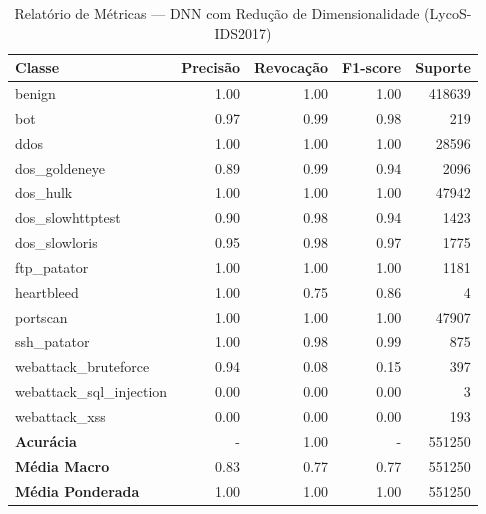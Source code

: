 \begin{table}[H]
    \centering
    \small
    \begin{tabular}{lrrrr}
        \hline
        Classe                    & Precisão & Revocação & F1-score & Suporte \\
        \hline
        benign                    & 1.00     & 1.00      & 1.00     & 418639  \\
        bot                       & 0.97     & 0.99      & 0.98     & 219     \\
        ddos                      & 1.00     & 1.00      & 1.00     & 28596   \\
        dos\_goldeneye            & 0.89     & 0.99      & 0.94     & 2096    \\
        dos\_hulk                 & 1.00     & 1.00      & 1.00     & 47942   \\
        dos\_slowhttptest         & 0.90     & 0.98      & 0.94     & 1423    \\
        dos\_slowloris            & 0.95     & 0.98      & 0.97     & 1775    \\
        ftp\_patator              & 1.00     & 1.00      & 1.00     & 1181    \\
        heartbleed                & 1.00     & 0.75      & 0.86     & 4       \\
        portscan                  & 1.00     & 1.00      & 1.00     & 47907   \\
        ssh\_patator              & 1.00     & 0.98      & 0.99     & 875     \\
        webattack\_bruteforce     & 0.94     & 0.08      & 0.15     & 397     \\
        webattack\_sql\_injection & 0.00     & 0.00      & 0.00     & 3       \\
        webattack\_xss            & 0.00     & 0.00      & 0.00     & 193     \\
        \hline
        \textbf{Acurácia}         & -        & 1.00      & -        & 551250  \\
        \textbf{Média Macro}      & 0.83     & 0.77      & 0.77     & 551250  \\
        \textbf{Média Ponderada}  & 1.00     & 1.00      & 1.00     & 551250  \\
        \hline
    \end{tabular}
    \caption{Relatório de Métricas — DNN com Redução de Dimensionalidade (LycoS-IDS2017)}
    \label{table:dnn_lycos_reducao_metricas}
\end{table}
